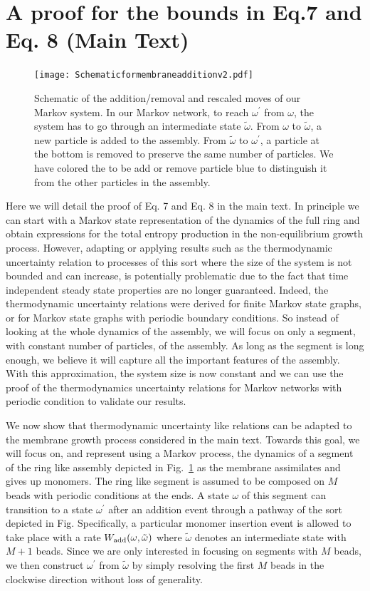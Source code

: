 \documentclass[amsmath,preprintnumbers,10pt,nofootinbib,prl,twocolumn]{revtex4-1}
\begin{document}
\section{A proof for the bounds in Eq.7 and Eq. 8 (Main Text) }
\begin{figure}[tbp]
\texttt{[image: Schematicformembraneadditionv2.pdf]}
\caption{ Schematic of the addition/removal and rescaled moves of our Markov system. In our Markov network, to reach $\omega^\prime$ from $\omega$, the system has to go through an intermediate state $\tilde{\omega}$. From $\omega$ to $\tilde{\omega}$, a new particle is added to the assembly. From $\tilde{\omega}$ to $\omega^\prime$, a particle at the bottom is removed to preserve the same number of particles. We have colored the to be add or remove particle blue to distinguish it from the other particles in the assembly.}
\label{fig:MarkovSchematic}
\end{figure}
Here we will detail the proof of Eq. 7 and Eq. 8 in the main text. In principle we can start with a Markov state representation of the dynamics of the full ring and obtain expressions for the total entropy production in the non-equilibrium growth process. However, adapting or applying results such as the thermodynamic uncertainty relation to processes of this sort where the size of the system is not bounded and can increase, is potentially problematic due to the fact that time independent steady state properties are no longer guaranteed. Indeed, the thermodynamic uncertainty relations were derived for finite Markov state graphs, or for Markov state graphs with periodic boundary conditions. So instead of looking at the whole dynamics of the assembly, we will focus on only a segment, with constant number of particles, of the assembly. As long as the segment is long enough, we believe it will capture all the important features of the assembly. With this approximation, the system size is now constant and we can use the proof of the thermodynamics uncertainty relations for Markov networks with periodic condition to validate our results. 

We now show that thermodynamic uncertainty like relations can be adapted to the membrane growth process considered in the main text. Towards this goal, we will focus on, and represent using a Markov process, the dynamics of a segment of the ring like assembly depicted in Fig.~\ref{fig:MarkovSchematic} as the membrane assimilates and gives up monomers. The ring like segment is assumed to be composed on $M$ beads with periodic conditions at the ends. A state $\omega$ of this segment can transition to a state $\omega^{\prime}$ after an addition event through a pathway of the sort depicted in Fig. Specifically, a particular monomer insertion event is allowed to take place with a rate $W_{\rm add}(\omega,\tilde{\omega})$ where $\tilde\omega$ denotes an intermediate state with $M+1$ beads. Since we are only interested in focusing on segments with $M$ beads, we then construct $\omega^\prime$ from $\tilde\omega$ by simply resolving the first $M$ beads in the clockwise direction without loss of generality. 
\end{document}
